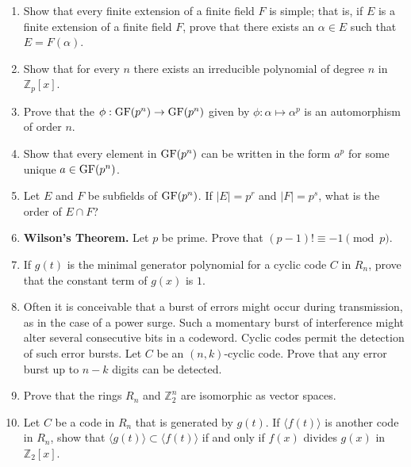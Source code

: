 {\begin{enumerate}
\item
Show that every finite extension of a finite field $F$ is simple;
that is, if $E$ is a finite extension of a finite field $F$, prove
that there exists an $\alpha \in E$ such that $E = F( \alpha )$.


\item
Show that for every $n$ there exists an irreducible polynomial of 
degree $n$ in~${\mathbb Z}_p[x]$.



\item \label{exercise:finite:frobeniusmap}
Prove that the  $\phi : \operatorname{GF}(p^n) \rightarrow \operatorname{GF}(p^n)$ given by $\phi : \alpha \mapsto
\alpha^p$ is an automorphism of order $n$. 


\item
Show that every element in $\operatorname{GF}(p^n)$ can be written in the form
$a^p$ for some unique $a \in \operatorname{GF}(p^n)$.


\item
Let $E$ and $F$ be subfields of $\operatorname{GF}(p^n)$. If $|E| = p^r$ and
$|F| = p^s$, what is the order of $E \cap F$? 


\item
\textbf{Wilson's Theorem.}
Let $p$ be prime.  Prove that $(p-1)! \equiv -1 \pmod{p}$. 


\item
If $g(t)$ is the minimal generator polynomial for a cyclic code $C$ in
$R_n$, prove that the constant term of $g(x)$ is $1$.


\item
Often it is conceivable that a burst of errors might occur during
transmission, as in the case of a power surge.  Such a momentary burst
of interference might alter several consecutive bits in a codeword.
Cyclic codes permit the detection of such error bursts. Let $C$ be an
$(n,k)$-cyclic code. Prove that any error burst up to $n-k$ digits can
be detected.  


\item
Prove that the rings $R_n$ and ${\mathbb Z}_2^n$ are isomorphic as vector
spaces. 


\item
Let $C$ be a code in $R_n$ that is generated by $g(t)$. If $\langle
f(t) \rangle$ is another code in $R_n$, show that $\langle g(t) \rangle
\subset \langle f(t) \rangle$ if and only if $f(x)$ divides $g(x)$ in
${\mathbb Z}_2[x]$.



\end{enumerate}}
